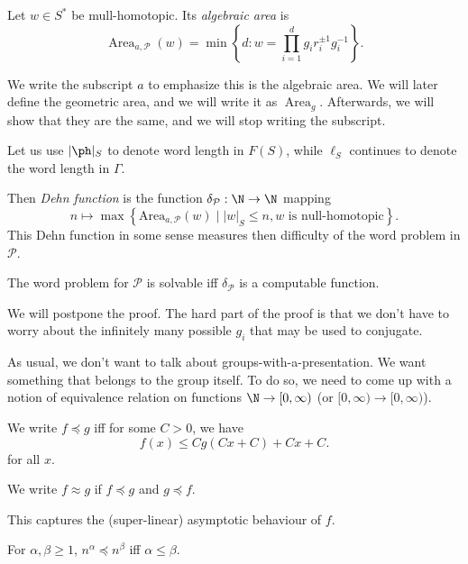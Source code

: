 \documentclass[a4paper]{article}
\DeclareMathOperator\Area{Area}
\begin{document}
\begin{defi}
  Let $w \in S^*$ be mull-homotopic. Its \emph{algebraic area} is 
  \[
    \Area_{a, \mathcal{P}} (w) = \min \left\{d : w = \prod_{i = 1}^d g_i r_i^{\pm 1} g_i^{-1}\right\}.
  \]
\end{defi}
We write the subscript $a$ to emphasize this is the algebraic area. We will later define the geometric area, and we will write it as $\Area_g$. Afterwards, we will show that they are the same, and we will stop writing the subscript.

Let us use $|\ph|_S$ to denote word length in $F(S)$, while $\ell_S$ continues to denote the word length in $\Gamma$.

\begin{defi}
  Then \emph{Dehn function} is the function $\delta_{\mathcal{P}}: \N \to \N$ mapping
  \[
    n \mapsto \max \left\{ \mathrm{Area}_{a, \mathcal{P}} (w) \mid |w|_S \leq n, w \text{ is null-homotopic}\right\}.
  \]
  This Dehn function in some sense measures then difficulty of the word problem in $\mathcal{P}$.
\end{defi}

\begin{prop}
  The word problem for $\mathcal{P}$ is solvable iff $\delta_{\mathcal{P}}$ is a computable function.
\end{prop}

We will postpone the proof. The hard part of the proof is that we don't have to worry about the infinitely many possible $g_i$ that may be used to conjugate.

As usual, we don't want to talk about groups-with-a-presentation. We want something that belongs to the group itself. To do so, we need to come up with a notion of equivalence relation on functions $\N \to [0, \infty)$ (or $[0, \infty) \to [0, \infty)$).

\begin{defi}[$\preccurlyeq$]\index{$\preccurlyeq$}
  We write $f \preccurlyeq g$ iff for some $C > 0$, we have
  \[
    f(x) \leq C g(Cx + C) + Cx + C.
  \]
  for all $x$.

  We write $f \approx g$ if $f \preccurlyeq g$ and $g \preccurlyeq f$.
\end{defi}
This captures the (super-linear) asymptotic behaviour of $f$.

\begin{eg}
  For $\alpha, \beta \geq 1$, $n^\alpha \preccurlyeq n^\beta$ iff $\alpha \leq \beta$.
\end{eg}
\end{document}
